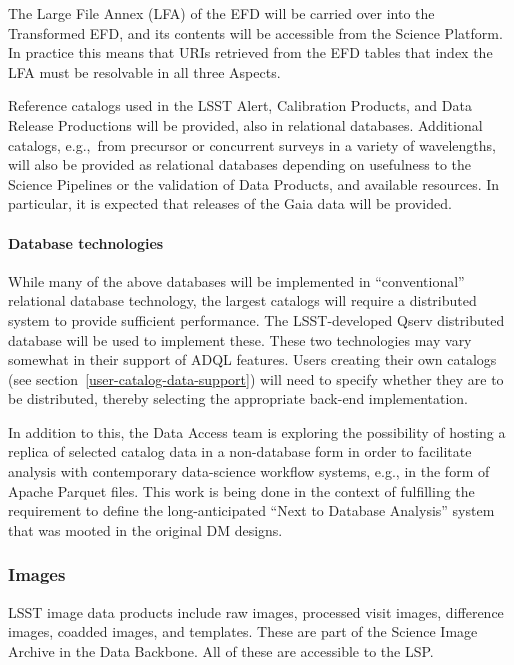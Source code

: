 The Large File Annex (LFA) of the EFD will be carried over into the Transformed
EFD, and its contents will be accessible from the Science Platform.
In practice this means that URIs retrieved from the EFD tables that index the
LFA must be resolvable in all three Aspects.

Reference catalogs used in the LSST Alert, Calibration Products, and Data
Release Productions will be provided, also in relational databases.
Additional catalogs, e.g.,\ from precursor or concurrent surveys in a variety
of wavelengths, will also be provided as relational databases depending on
usefulness to the Science Pipelines or the validation of Data Products,
and available resources.
In particular, it is expected that releases of the Gaia data will be provided.

\paragraph{Database technologies}\label{database-technologies}

While many of the above databases will be implemented in ``conventional''
relational database technology, the largest catalogs will require a distributed
system to provide sufficient performance.
The LSST-developed Qserv distributed database will be used to implement these.
These two technologies may vary somewhat in their support of ADQL features.
Users creating their own catalogs (see section~\ref{user-catalog-data-support})
will need to specify whether they are to be
distributed, thereby selecting the appropriate back-end implementation.

In addition to this, the Data Access team is exploring the possibility of 
hosting a replica of selected catalog data in a non-database form in order to
facilitate analysis with contemporary data-science workflow systems, e.g., 
in the form of Apache Parquet files.
This work is being done in the context of fulfilling the requirement to 
define the long-anticipated ``Next to Database Analysis'' system that was
mooted in the original DM designs.

\subsubsection{Images}\label{images}

LSST image data products include raw images, processed visit images, difference
images, coadded images, and templates.  These are part of the Science Image
Archive in the Data Backbone.  All of these are accessible to the LSP.

